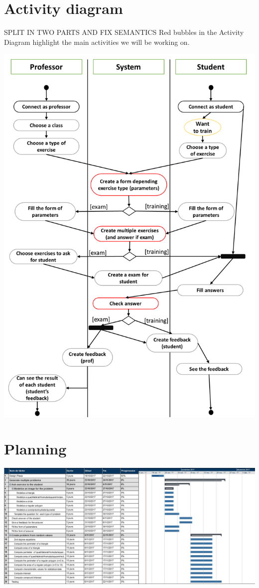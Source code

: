 \documentclass{article}
\begin{document}
\section{Activity diagram}
{\color{red}SPLIT IN TWO PARTS AND FIX SEMANTICS}
Red bubbles in the Activity Diagram highlight the main activities we will be working on.\\
\begin{center}
    \includegraphics[scale=0.78]{ActivityDiagram.png}
\end{center}
\section{Planning}
\begin{center}
    \includegraphics[scale=0.68,angle=90]{multipleproblems.jpg}
\end{center}
\end{document}
